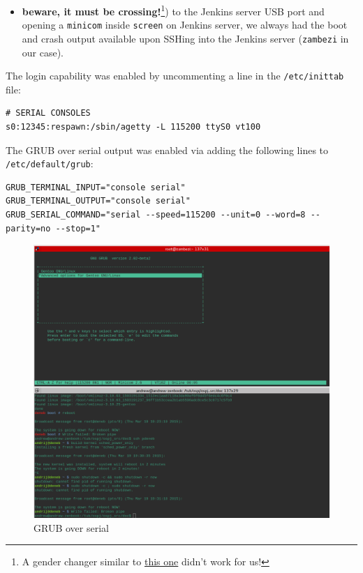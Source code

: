 \documentclass[]{report}
\begin{document}
\begin{itemize}
\itemsep1pt\parskip0pt
\item
  \textbf{beware, it must be crossing!}\footnote{A gender changer
    similar to
    \href{http://www.amazon.de/Gender-Changer-D-SUB-pol-Buchse/dp/B000LB4N3I/}{this
    one} didn't work for us!}) to the Jenkins server USB port and
  opening a \lstinline!minicom! inside \lstinline!screen! on Jenkins
  server, we always had the boot and crash output available upon SSHing
  into the Jenkins server (\lstinline!zambezi! in our case).
\end{itemize}

The login capability was enabled by uncommenting a line in the
\lstinline!/etc/inittab! file:

\begin{lstlisting}[style=simple]
# SERIAL CONSOLES
s0:12345:respawn:/sbin/agetty -L 115200 ttyS0 vt100
\end{lstlisting}

The GRUB over serial output was enabled via adding the following lines
to \lstinline!/etc/default/grub!:

\begin{lstlisting}[style=simple]
GRUB_TERMINAL_INPUT="console serial"
GRUB_TERMINAL_OUTPUT="console serial"
GRUB_SERIAL_COMMAND="serial --speed=115200 --unit=0 --word=8 --parity=no --stop=1"
\end{lstlisting}

\begin{figure}[htbp]
\centering
\includegraphics{img/grub-over-serial.png}
\caption{GRUB over serial}
\end{figure}
\end{document}
